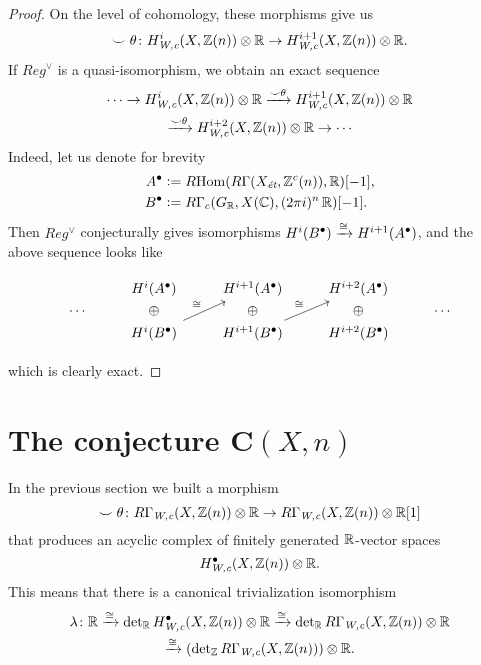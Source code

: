 \begin{theorem}
\begin{proof}
    On the level of cohomology, these morphisms give us
    \[ \smile\theta\colon H_\text{\it W,c}^i (X, \mathbb{Z} (n)) \otimes \mathbb{R} \to
      H_\text{\it W,c}^{i+1} (X, \mathbb{Z} (n)) \otimes \mathbb{R}. \]
    If $Reg^\vee$ is a quasi-isomorphism, we obtain an exact sequence
    \begin{multline*}
      \cdots \to H_\text{\it W,c}^i (X, \mathbb{Z} (n)) \otimes \mathbb{R}
      \xrightarrow{\smile\theta}
      H_\text{\it W,c}^{i+1} (X, \mathbb{Z} (n)) \otimes \mathbb{R} \\
      \xrightarrow{\smile\theta}
      H_\text{\it W,c}^{i+2} (X, \mathbb{Z} (n)) \otimes \mathbb{R} \to
      \cdots
    \end{multline*}
    Indeed, let us denote for brevity
    \begin{align*}
      A^\bullet & \mathrel{\mathop:}= R\!\operatorname{Hom} (R\Gamma (X_\text{\it ét}, \mathbb{Z}^c (n)), \mathbb{R}) [-1],\\
      B^\bullet & \mathrel{\mathop:}= R\Gamma_c (G_{\mathbb{R}}, X (\mathbb{C}), (2\pi i)^n\,\mathbb{R}) [-1].
    \end{align*}
    Then $Reg^\vee$ conjecturally gives isomorphisms
    $H^i (B^\bullet) \xrightarrow{\cong} H^{i+1} (A^\bullet)$, and the above
    sequence looks like

    \[ \begin{tikzcd}[row sep=0em]
        & H^i (A^\bullet) & H^{i+1} (A^\bullet) & H^{i+2} (A^\bullet) \\
        \cdots & \oplus & \oplus & \oplus & \cdots \\
        & H^i (B^\bullet)\ar{uur}{\isom} & H^{i+1} (B^\bullet)\ar{uur}{\isom} & H^{i+2} (B^\bullet)
      \end{tikzcd} \]

    \noindent which is clearly exact.
  \end{proof}
\end{theorem}


\section{The conjecture $\mathbf{C} (X,n)$}
\label{section:conjecture-C-X-n}

In the previous section we built a morphism
\[ \smile\theta\colon R\Gamma_\text{\it W,c} (X, \mathbb{Z} (n)) \otimes \mathbb{R} \to
  R\Gamma_\text{\it W,c} (X, \mathbb{Z} (n)) \otimes \mathbb{R} [1] \]
that produces an acyclic complex of finitely generated $\mathbb{R}$-vector spaces
$$H^\bullet_\text{\it W,c} (X, \mathbb{Z} (n)) \otimes \mathbb{R}.$$
This means that there is a canonical trivialization isomorphism
\begin{multline}
  \label{eqn:trivialization-morphism-lambda}
  \lambda\colon \mathbb{R} \xrightarrow{\cong}
  \det\nolimits_{\mathbb{R}} H^\bullet_\text{\it W,c} (X, \mathbb{Z} (n)) \otimes \mathbb{R}
  \xrightarrow{\cong}
  \det\nolimits_{\mathbb{R}} R\Gamma_\text{\it W,c} (X, \mathbb{Z} (n)) \otimes \mathbb{R} \\
  \xrightarrow{\cong}
  (\det\nolimits_{\mathbb{Z}} R\Gamma_\text{\it W,c} (X, \mathbb{Z} (n))) \otimes \mathbb{R}.
\end{multline}

